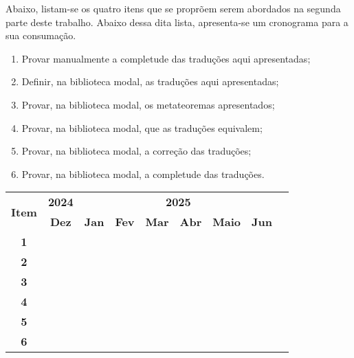         Abaixo, listam-se os quatro itens que se proprõem serem abordados na segunda parte deste trabalho. Abaixo dessa dita lista, apresenta-se um cronograma para a sua consumação.

        \begin{enumerate}
            \item Provar manualmente a completude  das traduções aqui apresentadas;
            \item Definir, na biblioteca modal, as traduções aqui apresentadas;
            \item Provar, na biblioteca modal, os metateoremas apresentados;
            \item Provar, na biblioteca modal, que as traduções equivalem;
            \item Provar, na biblioteca modal, a correção das traduções;
            \item Provar, na biblioteca modal, a completude das traduções.
        \end{enumerate}

        \setcounter{table}{1}

        \begin{table*}[htbp]
            \centering
            \begin{tabular}{|c|c|c|c|c|c|c|c|c|}
              \hline
              \multirow{2}{*}{\textbf{\small{Item}}} & \textbf{\small{2024}} & \multicolumn{6}{c|}{\textbf{\small{2025}}} \\
              \cline{2-8}
              & \textbf{Dez} & \textbf{Jan} & \textbf{Fev} & \textbf{Mar} & \textbf{Abr} & \textbf{Maio} & \textbf{Jun} \\
              \hline
              \textbf{\small{1}}  & \cellcolor{gray} & \cellcolor{gray} &  &  &  &  & \\
              \hline
              \textbf{\small{2}}  &  & \cellcolor{gray} &  &  &  &  & \\
              \hline
              \textbf{\small{3}}  &  & \cellcolor{gray} & \cellcolor{gray} & \cellcolor{gray} & &  & \\
              \hline
              \textbf{\small{4}}  &  &  & \cellcolor{gray} & \cellcolor{gray} & \cellcolor{gray} &  & \\
              \hline
              \textbf{\small{5}}  &  &  &  & \cellcolor{gray} & \cellcolor{gray} & \cellcolor{gray} & \\
              \hline
              \textbf{\small{6}}  &  &  &  &  & \cellcolor{gray} & \cellcolor{gray} & \cellcolor{gray}\\
              \hline
            \end{tabular}
          \end{table*}

    
    

